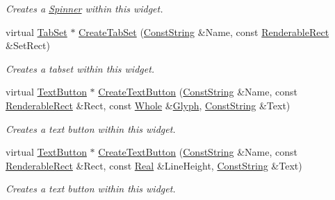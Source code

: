 \begin{DoxyCompactItemize}
\begin{DoxyCompactList}\small\item\em Creates a \hyperlink{classMezzanine_1_1UI_1_1Spinner}{Spinner} within this widget. \item\end{DoxyCompactList}\item 
virtual \hyperlink{classMezzanine_1_1UI_1_1TabSet}{TabSet} $\ast$ \hyperlink{classMezzanine_1_1UI_1_1RenderableContainerWidget_aa0ec24b4df0d3fd138f7b259fba1e30e}{CreateTabSet} (\hyperlink{namespaceMezzanine_a63cd699ac54b73953f35ec9cfc05e506}{ConstString} \&Name, const \hyperlink{structMezzanine_1_1UI_1_1RenderableRect}{RenderableRect} \&SetRect)
\begin{DoxyCompactList}\small\item\em Creates a tabset within this widget. \item\end{DoxyCompactList}\item 
virtual \hyperlink{classMezzanine_1_1UI_1_1TextButton}{TextButton} $\ast$ \hyperlink{classMezzanine_1_1UI_1_1RenderableContainerWidget_a7083c20a1b8e17c86f57265138f06ed9}{CreateTextButton} (\hyperlink{namespaceMezzanine_a63cd699ac54b73953f35ec9cfc05e506}{ConstString} \&Name, const \hyperlink{structMezzanine_1_1UI_1_1RenderableRect}{RenderableRect} \&Rect, const \hyperlink{namespaceMezzanine_adcbb6ce6d1eb4379d109e51171e2e493}{Whole} \&\hyperlink{classMezzanine_1_1UI_1_1Glyph}{Glyph}, \hyperlink{namespaceMezzanine_a63cd699ac54b73953f35ec9cfc05e506}{ConstString} \&Text)
\begin{DoxyCompactList}\small\item\em Creates a text button within this widget. \item\end{DoxyCompactList}\item 
virtual \hyperlink{classMezzanine_1_1UI_1_1TextButton}{TextButton} $\ast$ \hyperlink{classMezzanine_1_1UI_1_1RenderableContainerWidget_a8c5625278f0228bde4179b66ec933a65}{CreateTextButton} (\hyperlink{namespaceMezzanine_a63cd699ac54b73953f35ec9cfc05e506}{ConstString} \&Name, const \hyperlink{structMezzanine_1_1UI_1_1RenderableRect}{RenderableRect} \&Rect, const \hyperlink{namespaceMezzanine_a726731b1a7df72bf3583e4a97282c6f6}{Real} \&LineHeight, \hyperlink{namespaceMezzanine_a63cd699ac54b73953f35ec9cfc05e506}{ConstString} \&Text)
\begin{DoxyCompactList}\small\item\em Creates a text button within this widget. \item\end{DoxyCompactList}\item 

\end{DoxyCompactItemize}

